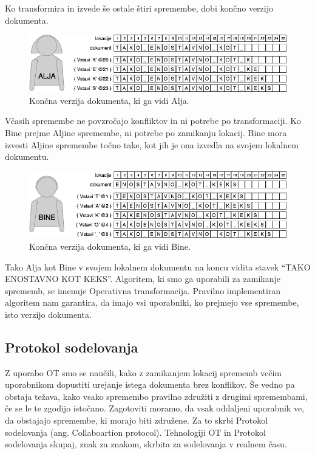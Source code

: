 \documentclass[a4paper, 12pt, twoside]{book}
\begin{document}
Ko transformira in izvede še ostale štiri spremembe, dobi končno verzijo dokumenta.

\begin{figure}[placement h]
\begin{center}
\includegraphics[width=12cm]{ot5.png}
\end{center}
\caption{Končna verzija dokumenta, ki ga vidi Alja.}
\label{ot5}
\end{figure}

Včasih spremembe ne povzročajo konfliktov in ni potrebe po transformaciji. Ko Bine prejme Aljine spremembe, ni potrebe po zamikanju lokacij. Bine mora izvesti Aljine spremembe točno take, kot jih je ona izvedla na svojem lokalnem dokumentu.

\begin{figure}[placement h]
\begin{center}
\includegraphics[width=12cm]{ot6.png}
\end{center}
\caption{Končna verzija dokumenta, ki ga vidi Bine.}
\label{ot6}
\end{figure}

Tako Alja kot Bine v svojem lokalnem dokumentu na koncu vidita stavek “TAKO ENOSTAVNO KOT KEKS”. Algoritem, ki smo ga uporabili za zamikanje sprememb, se imenuje Operativna transformacija. Pravilno implementiran algoritem nam garantira, da imajo vsi uporabniki, ko prejmejo vse spremembe, isto verzijo dokumenta.

\subsection{Protokol sodelovanja}

Z uporabo OT smo se naučili, kako z zamikanjem lokacij sprememb večim uporabnikom dopustiti urejanje istega dokumenta brez konflikov. Še vedno pa obstaja težava, kako vsako spremembo pravilno združiti z drugimi spremembami, če se le te zgodijo istočano. Zagotoviti moramo, da vsak oddaljeni uporabnik ve, da obstajajo spremembe, ki morajo biti združene. Za to skrbi Protokol sodelovanja (ang. Collaboartion protocol). Tehnologiji OT in Protokol sodelovanja skupaj, znak za znakom, skrbita za sodelovanja v realnem času.
\end{document}
